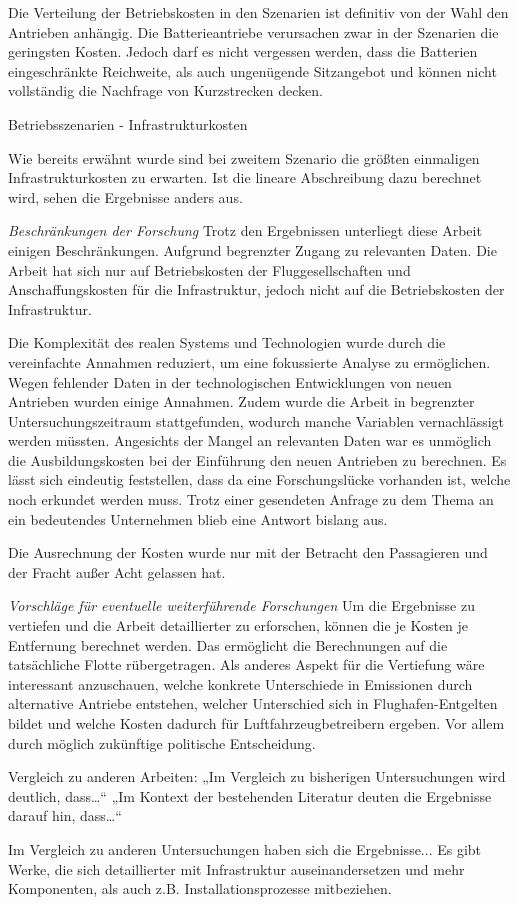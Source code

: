 Die Verteilung der Betriebskosten in den Szenarien ist definitiv von der Wahl den Antrieben anhängig. Die Batterieantriebe verursachen zwar
in der Szenarien die geringsten Kosten. Jedoch darf es nicht vergessen werden, dass die Batterien eingeschränkte Reichweite, als auch
ungenügende Sitzangebot und können nicht vollständig die Nachfrage von Kurzstrecken decken.

Betriebsszenarien - Infrastrukturkosten

Wie bereits erwähnt wurde sind bei zweitem Szenario die größten einmaligen Infrastrukturkosten zu erwarten.
Ist die lineare Abschreibung dazu berechnet wird, sehen die Ergebnisse anders aus.

\textit{Beschränkungen der Forschung}
Trotz den Ergebnissen unterliegt diese Arbeit einigen Beschränkungen. Aufgrund begrenzter Zugang zu relevanten Daten.
Die Arbeit hat sich nur auf Betriebskosten der Fluggesellschaften und Anschaffungskosten für die Infrastruktur,
jedoch nicht auf die Betriebskosten der Infrastruktur.

Die Komplexität des realen Systems und Technologien wurde durch die vereinfachte Annahmen reduziert, um eine fokussierte Analyse zu ermöglichen.
Wegen fehlender Daten in der technologischen Entwicklungen von neuen Antrieben wurden einige Annahmen.
Zudem wurde die Arbeit in begrenzter Untersuchungszeitraum stattgefunden, wodurch manche Variablen vernachlässigt werden müssten.
%
Angesichts der Mangel an relevanten Daten war es unmöglich die Ausbildungskosten bei der Einführung den neuen Antrieben zu berechnen.
Es lässt sich eindeutig feststellen, dass da eine Forschungslücke vorhanden ist, welche noch erkundet werden muss. 
Trotz einer gesendeten Anfrage zu dem Thema an ein bedeutendes Unternehmen blieb eine Antwort bislang aus.

Die Ausrechnung der Kosten wurde nur mit der Betracht den Passagieren und der Fracht außer Acht gelassen hat. 

\textit{Vorschläge für eventuelle weiterführende Forschungen}
Um die Ergebnisse zu vertiefen und die Arbeit detaillierter zu erforschen, können die je Kosten je Entfernung berechnet werden.
Das ermöglicht die Berechnungen auf die tatsächliche Flotte rübergetragen.
Als anderes Aspekt für die Vertiefung wäre interessant anzuschauen, welche konkrete Unterschiede in Emissionen durch 
alternative Antriebe entstehen, welcher Unterschied sich in Flughafen-Entgelten bildet und welche Kosten dadurch
für Luftfahrzeugbetreibern ergeben. Vor allem durch möglich zukünftige politische Entscheidung.

Vergleich zu anderen Arbeiten:
„Im Vergleich zu bisherigen Untersuchungen wird deutlich, dass…“
„Im Kontext der bestehenden Literatur deuten die Ergebnisse darauf hin, dass…“

Im Vergleich zu anderen Untersuchungen haben sich die Ergebnisse...
Es gibt Werke, die sich detaillierter mit Infrastruktur auseinandersetzen und mehr Komponenten, als auch z.B. Installationsprozesse
mitbeziehen. %

